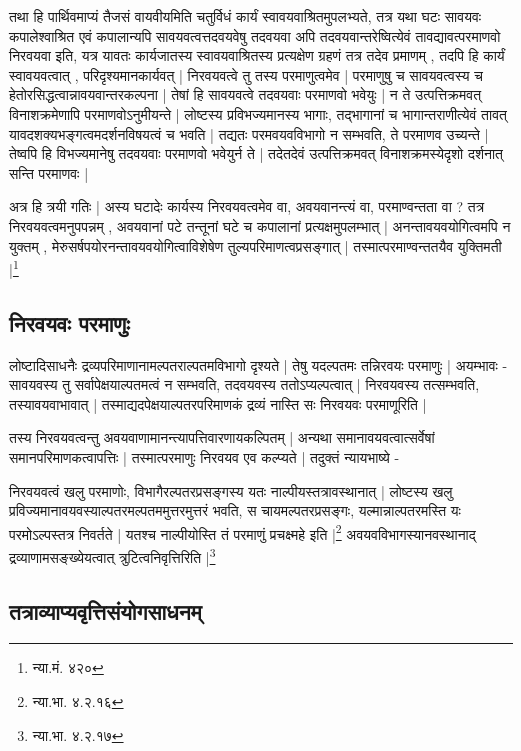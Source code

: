 {\fontsize{11.7}{0}\selectfont\s तथा हि पार्थिवमाप्यं तैजसं वायवीयमिति चतुर्विधं कार्यं स्वावयवाश्रितमुपलभ्यते, तत्र यथा घटः सावयवः कपालेश्वाश्रित  एवं कपालान्यपि सावयवत्वत्तदवयवेषु तदवयवा अपि तदवयवान्तरेष्वित्येवं तावद्यावत्परमाणवो निरवयवा इति, यत्र यावतः कार्यजातस्य स्वावयवाश्रितस्य प्रत्यक्षेण ग्रहणं तत्र तदेव प्रमाणम् , तदपि हि कार्यं स्वावयवत्वात् , परिदृश्यमानकार्यवत् | निरवयवत्वे तु तस्य परमाणुत्वमेव | परमाणुषु च सावयवत्वस्य च हेतोरसिद्धत्वान्नावयवान्तरकल्पना | तेषां हि सावयवत्वे तदवयवाः परमाणवो भवेयुः | न ते उत्पत्तिक्रमवत् विनाशक्रमेणापि परमाणवोऽनुमीयन्ते | लोष्टस्य प्रविभज्यमानस्य भागाः, तद्भागानां च भागान्तराणीत्येवं तावत् यावदशक्यभङ्गत्वमदर्शनविषयत्वं च भवति | तद्यतः परमवयवविभागो न सम्भवति, ते परमाणव उच्यन्ते | तेष्वपि हि विभज्यमानेषु तदवयवाः परमाणवो भवेयुर्न ते | तदेतदेवं उत्पत्तिक्रमवत् विनाशक्रमस्येदृशो दर्शनात् सन्ति परमाणवः |

अत्र हि त्रयी गतिः | अस्य घटादेः कार्यस्य निरवयवत्वमेव वा, अवयवानन्त्यं वा, परमाण्वन्तता वा ? तत्र निरवयवत्वमनुपपन्नम् , अवयवानां पटे तन्तूनां घटे च कपालानां प्रत्यक्षमुपलम्भात् | अनन्तावयवयोगित्वमपि न युक्तम् , मेरुसर्षपयोरनन्तावयवयोगित्वाविशेषेण तुल्यपरिमाणत्वप्रसङ्गात् | तस्मात्परमाण्वन्ततयैव युक्तिमती |\footnote{न्या.मं. ४२०}}

\subsection{निरवयवः परमाणुः}

लोष्टादिसाधनैः द्रव्यपरिमाणानामल्पतराल्पतमविभागो दृश्यते | तेषु यदल्पतमः तन्निरवयः परमाणुः | अयम्भावः - सावयवस्य तु सर्वापेक्षयाल्पतमत्वं न सम्भवति, तदवयवस्य ततोऽप्यल्पत्वात् | निरवयवस्य तत्सम्भवति, तस्यावयवाभावात् | तस्माद्यदपेक्षयाल्पतरपरिमाणकं द्रव्यं नास्ति सः निरवयवः परमाणूरिति |

तस्य निरवयवत्वन्तु अवयवाणामानन्त्यापत्तिवारणायकल्पितम् | अन्यथा समानावयवत्वात्सर्वेषां समानपरिमाणकत्वापत्तिः | तस्मात्परमाणुः निरवयव एव कल्प्यते | तदुक्तं न्यायभाष्ये - 

{\fontsize{11.7}{0}\selectfont\s निरवयवत्वं खलु परमाणोः, विभागैरल्पतरप्रसङ्गस्य यतः नाल्पीयस्तत्रावस्थानात् | लोष्टस्य खलु प्रविज्यमानावयवस्याल्पतरमल्पतममुत्तरमुत्तरं भवति, स चायमल्पतरप्रसङ्गः, यल्मान्नाल्पतरमस्ति यः परमोऽल्पस्तत्र निवर्तते | यतश्च नाल्पीयोस्ति तं परमाणुं प्रचक्ष्महे इति |\footnote{न्या.भा. ४.२.१६} अवयवविभागस्यानवस्थानाद् द्रव्याणामसङ्ख्येयत्वात् त्रुटित्वनिवृत्तिरिति |\footnote{न्या.भा. ४.२.१७}}

\subsection{तत्राव्याप्यवृत्तिसंयोगसाधनम्}

